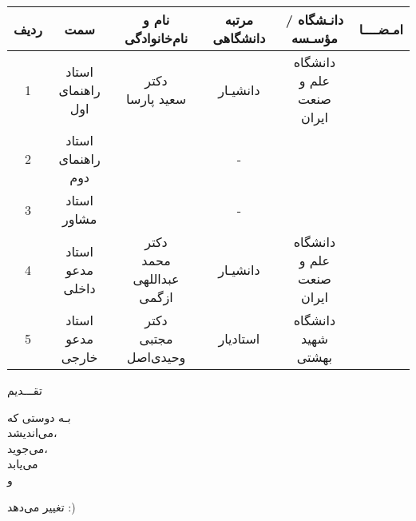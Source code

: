\begin{center}
\begin{tabularx}{1\linewidth}{|c|c|c|c|c|c|}
\hline
ردیف & سمت & نام و نام‌خانوادگی & مرتبه دانشگاهی & دانـشگاه / مؤسـسه & 
امـضــــا \hspace{5mm} \\
	\hline
	1 & 
	\makecell[c]{استاد \\ راهنمای اول} & 
	\makecell[c]{دکتر \\ سعید پارسا} &
 	دانشیـار &
	\makecell[c]{دانشگاه \\ علم و صنعت ایران} & 
	\hspace{30mm}\\
	\hline
	2 & 
	\makecell[c]{استاد \\ راهنمای دوم} &
	\makecell[c]{-} &
	- &
	\makecell[c]{-} &
	\\
	\hline
	3 & 
	\makecell[c]{استاد \\ مشاور } &
	\makecell[c]{-} &
	- &
	\makecell[c]{-} &
	\\
	\hline
	4 & 
	\makecell[c]{استاد \\ مدعو داخلی} & 
	\makecell[c]{دکتر \\ محمد عبداللهی ازگمی} & 
	دانشیـار &
	\makecell[c]{دانشگاه \\ علم و صنعت ایران} & 
	\\
	\hline
	5 &	
	\makecell[c]{استاد \\ مدعو خارجی} &
	\makecell[c]{دکتر \\ مجتبی وحیدی‌اصل} & 
	 استادیار &
	\makecell[c]{دانشگاه \\ شهید بهشتی} & 
	\\
	\hline
\end{tabularx}
\end{center}

\esalatPage
\mojavezPage





\newpage
\thispagestyle{empty}
\centerline{\Large \titlefont  تقـــدیم }
\begin{center}
{\LARGE
	\vspace{12mm} 
بـه دوستی که\\
\vspace{5mm}
می‌اندیشد،\\
می‌جوید،\\
می‌‌یابد\\
و\\

\vspace{6mm}

{\Huge تغییر می‌دهد :)\\}
}
\end{center}





